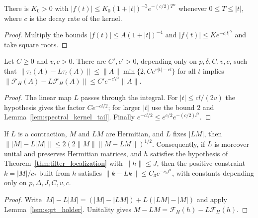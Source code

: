 \begin{lemma}
    \label{lem:spectral_kernel_tail}
    \leanok
    There is $K_0>0$ with
    $|f(t)|\le K_0(1+|t|)^{-2}e^{-(c/2)T^\alpha}$ whenever $0\le T\le|t|$,
    where $c$ is the decay rate of the kernel.
\end{lemma}
\begin{proof}\leanok
    Multiply the bounds $|f(t)|\le A(1+|t|)^{-4}$ and
    $|f(t)|\le Ke^{-c|t|^\alpha}$ and take square roots.
\end{proof}

\begin{theorem}
    \label{thm:filter_localization}
    \leanok
    Let $C\ge0$ and $v,c>0$. There are $C',c'>0$, depending only on
    $p,\delta,C,v,c$, such that
    $\|\tau_t(A)-L\tau_t(A)\|\le\|A\|\min\{2,Ce^{v|t|-cl}\}$ for all $t$
    implies $\|\mathcal F_H(A)-L\mathcal F_H(A)\|\le C'e^{-c'l^\alpha}\|A\|$.
\end{theorem}
\begin{proof}\leanok
    The linear map $L$ passes through the integral. For $|t|\le cl/(2v)$ the
    hypothesis gives the factor $Ce^{-cl/2}$; for larger $|t|$ use the bound
    $2$ and Lemma~\ref{lem:spectral_kernel_tail}. Finally
    $e^{-cl/2}\le e^{c/2}e^{-(c/2)l^\alpha}$.
\end{proof}

\begin{theorem}
    \label{thm:positive_constraint_tail}
    \leanok
    If $L$ is a contraction, $M$ and $LM$ are Hermitian, and $L$ fixes $|LM|$,
    then $\||M|-L|M|\|\le2(2\|M\|\|M-LM\|)^{1/2}$. Consequently, if $L$ is
    moreover unital and preserves Hermitian matrices, and $h$ satisfies the
    hypothesis of Theorem~\ref{thm:filter_localization} with $\|h\|\le J$,
    then the positive constraint $k=|M|/c_*$ built from $h$ satisfies
    $\|k-Lk\|\le C_3e^{-c_3l^\alpha}$, with constants depending only on
    $p,\Delta,J,C,v,c$.
\end{theorem}
\begin{proof}\leanok
    Write $|M|-L|M|=(|M|-|LM|)+L(|LM|-|M|)$ and apply
    Lemma~\ref{lem:sqrt_holder}. Unitality gives $M-LM=\mathcal F_H(h)-L\mathcal F_H(h)$.
\end{proof}

